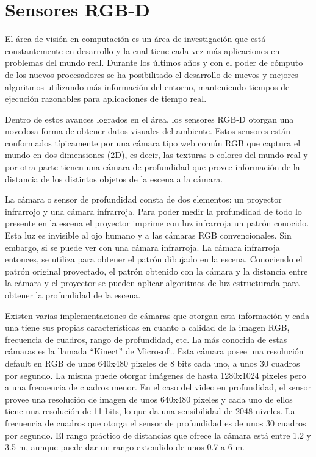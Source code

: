\chapter{Sensores RGB-D}
El área de visión en computación es un área de investigación que está constantemente en desarrollo y la cual tiene cada vez más aplicaciones en problemas del mundo real. Durante los últimos años y con el poder de cómputo de los nuevos procesadores se ha posibilitado el desarrollo de nuevos y mejores algoritmos utilizando más información del entorno, manteniendo tiempos de ejecución razonables para aplicaciones de tiempo real.

Dentro de estos avances logrados en el área, los sensores RGB-D otorgan una novedosa forma de obtener datos visuales del ambiente. Estos sensores están conformados típicamente por una cámara tipo web común RGB que captura el mundo en dos dimensiones (2D), es decir, las texturas o colores del mundo real y por otra parte tienen una cámara de profundidad que provee información de la distancia de los distintos objetos de la escena a la cámara.

La cámara o sensor de profundidad consta de dos elementos: un proyector infrarrojo y una cámara infrarroja. Para poder medir la profundidad de todo lo presente en la escena el proyector imprime con luz infrarroja un patrón conocido. Esta luz es invisible al ojo humano y a las cámaras RGB convencionales. Sin embargo, si se puede ver con una cámara infrarroja. La cámara infrarroja entonces, se utiliza para obtener el patrón dibujado en la escena. Conociendo el patrón original proyectado, el patrón obtenido con la cámara y la distancia entre la cámara y el proyector se pueden aplicar algoritmos de luz estructurada para obtener la profundidad de la escena.

Existen varias implementaciones de cámaras que otorgan esta información y cada una tiene sus propias características en cuanto a calidad de la imagen RGB, frecuencia de cuadros, rango de profundidad, etc. La más conocida de estas cámaras es la llamada ``Kinect'' de Microsoft. Esta cámara posee una resolución default en RGB de unos 640x480 pixeles de 8 bits cada uno, a unos 30 cuadros por segundo. La misma puede otorgar imágenes de hasta 1280x1024 pixeles pero a una frecuencia de cuadros menor. En el caso del video en profundidad, el sensor provee una resolución de imagen de unos 640x480 pixeles y cada uno de ellos tiene una resolución de 11 bits, lo que da una sensibilidad de 2048 niveles. La frecuencia de cuadros que otorga el sensor de profundidad es de unos 30 cuadros por segundo. El rango práctico de distancias que ofrece la cámara está entre 1.2 y 3.5 m, aunque puede dar un rango extendido de unos 0.7 a 6 m.

